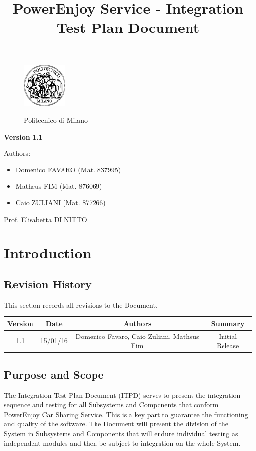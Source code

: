 \documentclass[a4paper]{article}
\title{PowerEnjoy Service - Integration Test Plan Document}
\begin{document}
\begin{titlepage}
\begin{figure}
\centering
\includegraphics[width=0.2\textwidth]{polimi.jpg}
\par
\LARGE Politecnico di Milano
\end{figure}


\maketitle
\textbf{Version 1.1}
\newline

\raggedright
Authors:
\begin{itemize}
	\item Domenico FAVARO (Mat. 837995)
        	\item Matheus FIM (Mat. 876069)
	\item Caio ZULIANI (Mat. 877266)	
\end{itemize}
\raggedleft
Prof. Elisabetta DI NITTO
\thispagestyle{empty}
\end{titlepage}


\tableofcontents
\newpage
 
\section{Introduction}
\subsection{Revision History}
This section records all revisions to the Document.
\newline \newline
\begin{tabular}{ | c | c | c | c | }
\hline
	Version & Date & Authors & Summary \\ \hline
	1.1 & 15/01/16 & Domenico Favaro, Caio Zuliani, Matheus Fim & Initial Release  \\ \hline
\end{tabular}

\subsection{Purpose and Scope}
The Integration Test Plan Document (ITPD) serves to present the integration sequence and testing for all Subsystems and Components that conform PowerEnjoy Car Sharing Service. This is a key part to guarantee the functioning and quality of the software. The Document will present the division of the System in Subsystems and Components that will endure individual testing as independent modules and then be subject to integration on the whole System.
\end{document}
